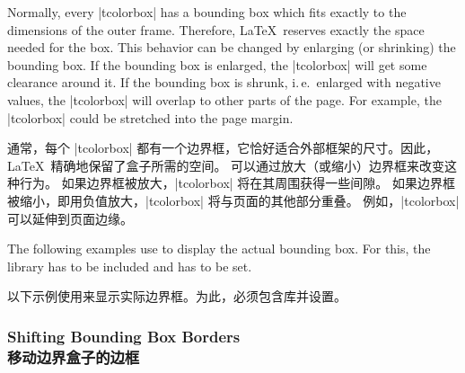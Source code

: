 
Normally, every |tcolorbox| has a bounding box which fits exactly to the
dimensions of the outer frame. Therefore, \LaTeX\ reserves exactly the space
needed for the box.
This behavior can be changed by enlarging (or shrinking) the bounding box.
If the bounding box is enlarged, the |tcolorbox| will get some clearance
around it. If the bounding box is shrunk, i.\,e.\ enlarged with negative
values, the |tcolorbox| will overlap to other parts of the page.
For example, the |tcolorbox| could be stretched into the page margin.

通常，每个 |tcolorbox| 都有一个边界框，它恰好适合外部框架的尺寸。因此，\LaTeX\ 精确地保留了盒子所需的空间。 可以通过放大（或缩小）边界框来改变这种行为。 如果边界框被放大，|tcolorbox| 将在其周围获得一些间隙。 如果边界框被缩小，即用负值放大，|tcolorbox| 将与页面的其他部分重叠。 例如，|tcolorbox| 可以延伸到页面边缘。


\begin{marker}
The following examples use  to display the actual bounding box. For this, the library  has to be included and  has to be set.

以下示例使用来显示实际边界框。为此，必须包含库并设置。
\end{marker}



\subsubsection{Shifting Bounding Box Borders\\移动边界盒子的边框}

